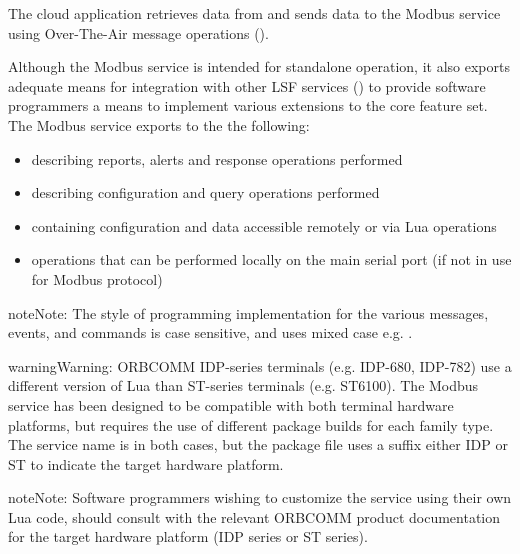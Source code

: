 \documentclass[letterpaper,10pt,english]{sphinxmanual}
\begin{document}
The cloud application retrieves data from and sends data to the Modbus service using Over-The-Air message operations ().

Although the Modbus service is intended for standalone operation, it also exports adequate means for integration with other LSF services () to provide software programmers a means to implement various extensions to the core feature set.
The Modbus service exports to the  the following:
\begin{itemize}
\item {} 
 describing reports, alerts and response operations performed 

\item {} 
 describing configuration and query operations performed 

\item {} 
 containing configuration and data accessible remotely or via Lua operations

\item {} 
 operations that can be performed locally on the main serial port (if not in use for Modbus protocol)

\end{itemize}

\begin{sphinxadmonition}{note}{Note:}
The style of programming implementation for the various messages, events, and commands is case sensitive, and uses mixed case e.g. .
\end{sphinxadmonition}

\begin{sphinxadmonition}{warning}{Warning:}
ORBCOMM IDP-series terminals (e.g. IDP-680, IDP-782) use a different version of Lua than ST-series terminals (e.g. ST6100).  The Modbus service has been designed to be compatible with both terminal hardware platforms, but requires the use of different package builds for each family type.  The service name is  in both cases, but the package file uses a suffix either \textendash{}IDP or \textendash{}ST to indicate the target hardware platform.
\end{sphinxadmonition}

\begin{sphinxadmonition}{note}{Note:}
Software programmers wishing to customize the service using their own Lua code, should consult with the relevant ORBCOMM product documentation for the target hardware platform (IDP series or ST series).
\end{sphinxadmonition}
\end{document}
